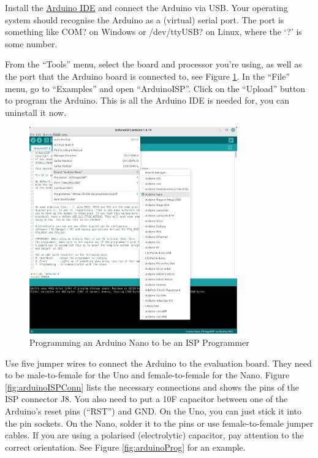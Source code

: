 \documentclass{article}
\begin{document}
Install the \href{https://www.arduino.cc/en/software}{Arduino IDE} and connect the Arduino via USB. Your operating system should recognise the Arduino as a (virtual) serial port. The port is something like COM? on Windows or /dev/ttyUSB? on Linux, where the `?' is some number. 

From the ``Tools'' menu, select the board and processor you're using, as well as the port that the Arduino board is connected to, see Figure \ref{fig:arduinoIDE}. In the ``File'' menu, go to ``Examples'' and open ``ArduinoISP''. Click on the ``Upload'' button to program the Arduino. This is all the Arduino IDE is needed for, you can uninstall it now. 

\begin{figure}[htb]
\centering
\includegraphics[width=0.8\textwidth]{Pictures/ArduinoIDE.png}
\caption{Programming an Arduino Nano to be an ISP Programmer}
\label{fig:arduinoIDE}
\end{figure}

Use five jumper wires to connect the Arduino to the evaluation board. They need to be male-to-female for the Uno and female-to-female for the Nano. Figure \ref{fig:arduinoISPConn} lists the necessary connections and shows the pins of the ISP connector J8. You also need to put a 10\textmu F capacitor between one of the Arduino's reset pins (``RST'') and GND. On the Uno, you can just stick it into the pin sockets. On the Nano, solder it to the pins or use female-to-female jumper cables. If you are using a polarised (electrolytic) capacitor, pay attention to the correct orientation. See Figure \ref{fig:arduinoProg} for an example. 
\end{document}
